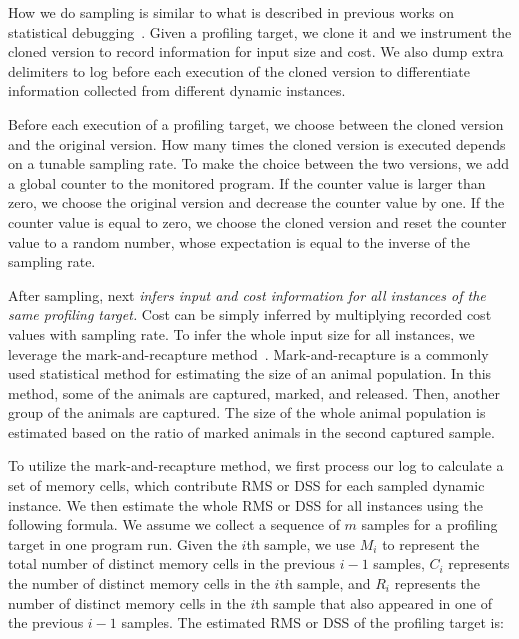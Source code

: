 {{How we do sampling is similar to what is described in previous works 
on statistical debugging~\cite{liblit03,liblit05,CCI,SongOOPSLA2014,ldoctor}.
Given a profiling target, 
we clone it
and we instrument the cloned version to record information for input size and cost.
We also dump extra delimiters to log before each 
execution of the cloned version
to differentiate information collected from different dynamic instances. 

Before each execution of a profiling target, 
we choose between the cloned version and the original version. 
How many times the cloned version is executed 
depends on a tunable sampling rate. 
To make the choice between the two versions,
we add a global counter to the monitored program. 
If the counter value is larger than zero, 
we choose the original version and decrease the counter value by one.
If the counter value is equal to zero,
we choose the cloned version and reset the counter value to 
a random number, 
whose expectation is 
equal to the inverse of the sampling rate.  




After sampling, \Tool next \emph{infers input and cost information
for all instances of the same profiling target.} 
Cost can be simply inferred by multiplying recorded cost values with sampling rate.
To infer the whole input size for all instances, 
we leverage the mark-and-recapture method~\cite{mark-recapture}. 
Mark-and-recapture is a commonly used statistical method 
for estimating the size of an animal population. 
In this method, some of the animals are captured, marked, and released. 
Then, another group of the animals are captured.
The size of the whole animal population is estimated 
based on the ratio of marked animals in the second captured sample. 
 

To utilize the mark-and-recapture method, 
we first process our log to calculate a set of memory cells, 
which contribute RMS
or DSS for each sampled dynamic instance. 
We then estimate the whole RMS or DSS for all instances using the following formula.
We assume we collect a sequence of $m$ samples for a profiling target 
in one program run.
Given the $i$th sample, we use $M_i$ to represent the 
total number of distinct memory cells in the previous $i-1$ samples, 
$C_i$ represents the number of distinct memory cells in the $i$th sample,
and $R_i$ represents the number of distinct memory cells in 
the $i$th sample that also appeared in one of the previous $i-1$ samples.
The estimated RMS or DSS of the profiling target is:

}}
